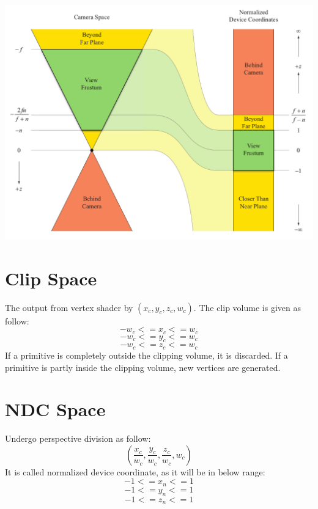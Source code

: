 \documentclass{article}
\begin{document}
\begin{center}
    \includegraphics[scale=0.25]{./ndc.png}
\end{center}

\section*{Clip Space}
The output from vertex shader by \((x_{c}, y_{c}, z_{c}, w_{c})\). The clip volume
is given as follow:
\[-w_{c} <= x_{c} <= w_{c}\]
\[-w_{c} <= y_{c} <= w_{c}\]
\[-w_{c} <= z_{c} <= w_{c}\]
If a primitive is completely outside the clipping volume, it is discarded.
If a primitive is partly inside the clipping volume, new vertices are generated.

\section*{NDC Space}
Undergo perspective division as follow:
\[(\frac{x_{c}}{w_{c}}, \frac{y_{c}}{w_{c}}, \frac{z_{c}}{w_{c}}, w_{c})\]
It is called normalized device coordinate, as it will be in below range:
\[-1 <= x_{n} <= 1\]
\[-1 <= y_{n} <= 1\]
\[-1 <= z_{n} <= 1\]
\end{document}
